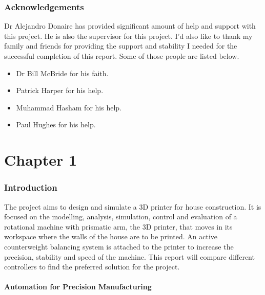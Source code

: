 \documentclass{UoNMCHA}
\numberwithin{equation}{section}
\begin{document}
	\section*{Acknowledgements}
	
	Dr Alejandro Donaire has provided significant amount of help and support with this project. He is also the supervisor for this project. I'd also like to thank my family and friends for providing the support and stability I needed for the successful completion of this report. Some of those people are listed below.
	\begin{itemize}
		\item Dr Bill McBride for his faith.
		\item Patrick Harper for his help.
		\item Muhammad Hasham for his help.
		\item Paul Hughes for his help.
		
	\end{itemize}
	
	\newpage
	\tableofcontents
	
	\newpage
	
	\listoffigures
	
	\newpage
	
	\listoftables
	
	\newpage

	\part*{Chapter 1} 


	\section{Introduction}
	
The project aims to design and simulate a 3D printer for house construction. It is focused on the modelling, analysis, simulation, control and evaluation of a rotational machine with prismatic arm, the 3D printer, that moves in its workspace where the walls of the house are to be printed. An active counterweight balancing system is attached to the printer to increase the precision, stability and speed of the machine. This report will compare different controllers to find the preferred solution for the project.
	
	
	\subsection{Automation for Precision Manufacturing}\label{Automation for Precision manufacturing}
	
\end{document}

